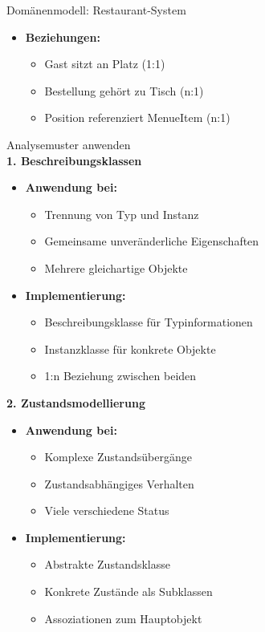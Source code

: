 \begin{example2}{Domänenmodell: Restaurant-System}
\begin{itemize}
    \item \textbf{Beziehungen:}
    \begin{itemize}
        \item Gast sitzt an Platz (1:1)
        \item Bestellung gehört zu Tisch (n:1)
        \item Position referenziert MenueItem (n:1)
    \end{itemize}
\end{itemize}
\end{example2}

\begin{KR}{Analysemuster anwenden}\\
\textbf{1. Beschreibungsklassen}
\begin{itemize}
    \item \textbf{Anwendung bei:}
    \begin{itemize}
        \item Trennung von Typ und Instanz
        \item Gemeinsame unveränderliche Eigenschaften
        \item Mehrere gleichartige Objekte
    \end{itemize}
    
    \item \textbf{Implementierung:}
    \begin{itemize}
        \item Beschreibungsklasse für Typinformationen
        \item Instanzklasse für konkrete Objekte
        \item 1:n Beziehung zwischen beiden
    \end{itemize}
\end{itemize}

\textbf{2. Zustandsmodellierung}
\begin{itemize}
    \item \textbf{Anwendung bei:}
    \begin{itemize}
        \item Komplexe Zustandsübergänge
        \item Zustandsabhängiges Verhalten
        \item Viele verschiedene Status
    \end{itemize}
    
    \item \textbf{Implementierung:}
    \begin{itemize}
        \item Abstrakte Zustandsklasse
        \item Konkrete Zustände als Subklassen
        \item Assoziationen zum Hauptobjekt
    \end{itemize}
\end{itemize}


\end{KR}
